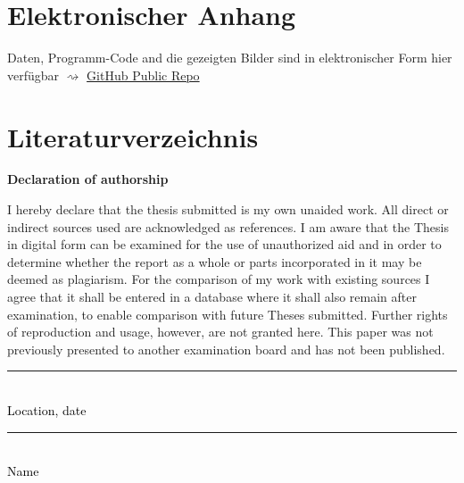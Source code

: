 \documentclass[12pt]{article}
\theoremstyle{definition}
\begin{document}
\section{Elektronischer Anhang}
\label{ElektronischerAppendix}
Daten, Programm-Code and die gezeigten Bilder sind in 
elektronischer Form hier verfügbar
$\rightsquigarrow$
\href{https://github.com/AndreBetat266/Bachelorarbeit_Betat/tree/main}
{GitHub Public Repo}
\newpage
    
\RaggedRight
\pagebreak
\section{Literaturverzeichnis}
\printbibliography[heading=none]
%
\newpage


\Large
\noindent
\textbf{Declaration of authorship} 
\vspace{0.5cm}
\noindent
\normalsize

I hereby declare that the thesis submitted is my own unaided work. All direct 
or indirect sources used are acknowledged as references. I am aware that the 
Thesis in digital form can be examined for the use of unauthorized aid and in 
order to determine whether the report as a whole or parts incorporated in it may 
be deemed as plagiarism. For the comparison of my work with existing sources I 
agree that it shall be entered in a database where it shall also remain after 
examination, to enable comparison with future Theses submitted. Further rights 
of reproduction and usage, however, are not granted here. This paper was not 
previously presented to another examination board and has not been published.
\\

\vspace{2.0cm}
\noindent\rule{0.5\textwidth}{0.4pt} \\
\textcolor{black}{Location, date} \\

\vspace{3cm}

\noindent\rule{0.5\textwidth}{0.4pt} \\

\textcolor{black}{Name}
\end{document}
